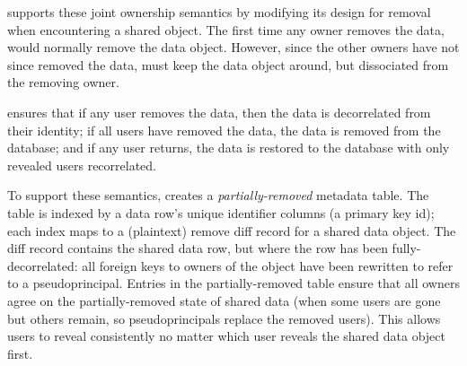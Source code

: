 \sys supports these joint ownership semantics by modifying its design for
removal when encountering a shared object.
%
The first time any owner removes the data, \sys would normally remove the data
object. However, since the other owners have not since removed the data, \sys
must keep the data object around, but dissociated from the removing owner.
%

%
\sys ensures that \one{} if any user removes the data, then the data is
decorrelated from their identity; \two{} if all users have removed the data, the
data is removed from the database; and \three{} if any user returns, the data is
restored to the database with only revealed users recorrelated.  
%

%
To support these semantics, \sys creates a \emph{partially-removed} metadata
table. The table is indexed by a data row's unique identifier columns (\eg a
primary key id); each index maps to a (plaintext) remove diff record for a
shared data object. The diff record contains the shared data row, but where the
row has been fully-decorrelated: all foreign keys to owners of the object have
been rewritten to refer to a pseudoprincipal.
%
Entries in the partially-removed table ensure that all owners agree on the
partially-removed state of shared data (\eg when some users are gone but others
remain, so pseudoprincipals replace the removed users). This allows users to
reveal consistently no matter which user reveals the shared data object first. 
%


